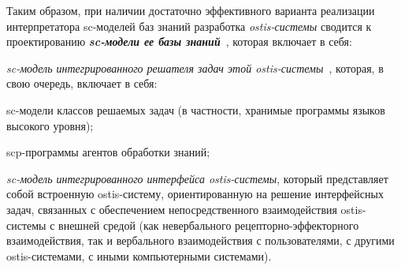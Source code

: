 \begin{SCn}
{Таким образом, при наличии достаточно эффективного варианта реализации интерпретатора sc-моделей баз знаний разработка \textit{ostis-системы} сводится к проектированию \textit{\textbf{sc-модели ее базы знаний}}~\cite{Davydenko2018}, которая включает в себя:

\begin{scnitemize}
    \item \textit{sc-модель интегрированного решателя задач этой ostis-системы}~\cite{Shunkevich2018}, которая, в свою очередь, включает в себя:
    \begin{scnitemizeii}
        \item sc-модели классов решаемых задач (в частности, хранимые программы языков высокого уровня);
        \item scp-программы агентов обработки знаний;
    \end{scnitemizeii}
     \item  \textit{sc-модель интегрированного интерфейса ostis-системы}, который представляет собой встроенную ostis-систему, ориентированную на решение интерфейсных задач, связанных с обеспечением непосредственного взаимодействия ostis-системы с внешней средой (как невербального рецепторно-эффекторного взаимодействия, так и вербального взаимодействия с пользователями, с другими ostis-системами, с иными компьютерными системами).
\end{scnitemize}
}

\scnendstruct

\end{SCn}